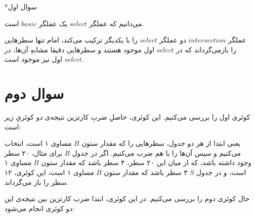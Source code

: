 


\newenvironment{eng}{\begin{LTRbibitems}\resetlatinfont{#1}\end{LTRbibitems}}

\section*{\centering سوال اول
}



می‌دانیم که عملگر
$select$
یک عملگر
$basic$
است.


عملگر
$intersection$
دو عملگر
$select$
را با یکدیگر ترکیب می‌کند، امام تنها سطرهایی را بازمی‌گرداند که در 
$select$
 اول موجود هستند و سطرهایی دقیقا مشابهِ آن‌ها، در
$select$
اول نیز موجود است.


\section*{\centering سوال دوم
}

کوئری اول را بررسی می‌کنیم.
این کوئری، حاصلِ ضربِ کارتزین نتیجه‌ی دو کوئریِ زیر است:




    

\begin{LTRbibitems}\end{LTRbibitems}

\begin{LTRbibitems}\end{LTRbibitems}



یعنی ابتدا از هر دو جدول، سطرهایی را که مقدار ستون
$B$
مساوی ۱ است، انتخاب می‌کنیم و سپس آن‌ها را با هم ضرب می‌کنیم.
اگر در جدول
$R$
برای مثال، ۲۰ سطر وجود داشته باشد، که از میان این ۲۰ سطر، ۴ سطر باشد که مقدار ستون
$B$
مساوی ۱ است، و در جدول
$S$
۳ سطر باشد که مقدار ستون
$B$
مساوی ۱ است، این کوئری، ۱۲ سطر را باز می‌گرداند.

حال کوئری دوم را بررسی می‌کنیم.
در این کوئری، ابتدا ضرب کارتزین بین نتیجه‌ی این دو کوئری انجام می‌شود:


